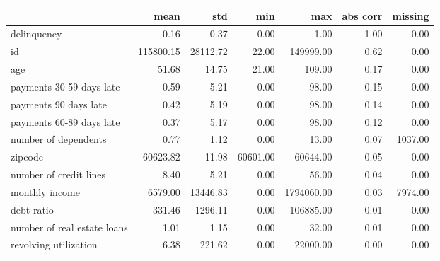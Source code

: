 \begin{tabular}{lrrrrrr}
\toprule
{} &      mean &      std &      min &        max &  abs corr &  missing \\
\midrule
delinquency                 &      0.16 &     0.37 &     0.00 &       1.00 &      1.00 &     0.00 \\
id                          & 115800.15 & 28112.72 &    22.00 &  149999.00 &      0.62 &     0.00 \\
age                         &     51.68 &    14.75 &    21.00 &     109.00 &      0.17 &     0.00 \\
payments 30-59 days late    &      0.59 &     5.21 &     0.00 &      98.00 &      0.15 &     0.00 \\
payments 90 days late       &      0.42 &     5.19 &     0.00 &      98.00 &      0.14 &     0.00 \\
payments 60-89 days late    &      0.37 &     5.17 &     0.00 &      98.00 &      0.12 &     0.00 \\
number of dependents        &      0.77 &     1.12 &     0.00 &      13.00 &      0.07 &  1037.00 \\
zipcode                     &  60623.82 &    11.98 & 60601.00 &   60644.00 &      0.05 &     0.00 \\
number of credit lines      &      8.40 &     5.21 &     0.00 &      56.00 &      0.04 &     0.00 \\
monthly income              &   6579.00 & 13446.83 &     0.00 & 1794060.00 &      0.03 &  7974.00 \\
debt ratio                  &    331.46 &  1296.11 &     0.00 &  106885.00 &      0.01 &     0.00 \\
number of real estate loans &      1.01 &     1.15 &     0.00 &      32.00 &      0.01 &     0.00 \\
revolving utilization       &      6.38 &   221.62 &     0.00 &   22000.00 &      0.00 &     0.00 \\
\bottomrule
\end{tabular}
